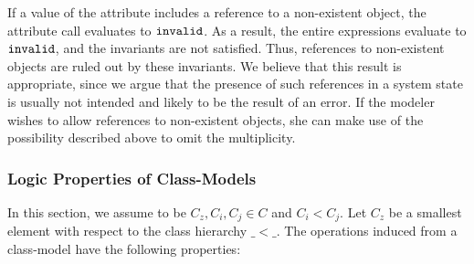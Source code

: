 If a value of the attribute  includes a reference to a non-existent
object, the attribute call evaluates to $\mathtt{invalid}$. As a result, the
entire expressions evaluate to $\mathtt{invalid}$, and the invariants are not
satisfied. Thus, references to non-existent objects are ruled out by these
invariants. We believe that this result is appropriate, since we argue that the
presence of such references in a system state is usually not intended and likely
to be the result of an error. If the modeler wishes to allow references to
non-existent objects, she can make use of the possibility described above to
omit the multiplicity.

\subsubsection{Logic Properties of Class-Models}\label{sec:logicprop-datamodel}
In this section, we assume to be $C_z,C_i,C_j \in C$ and  $C_i < C_j$. 
Let $C_z$ be a smallest element with respect to the class hierarchy $\_ < \_$.
The operations induced from a class-model have the following properties:
